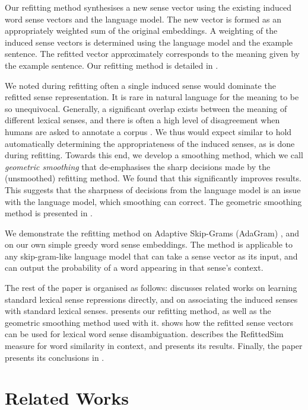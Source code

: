 \documentclass{sig-alternate}
\begin{document}
Our refitting method synthesises a new sense vector using the existing induced word sense vectors and the language model.
The new vector is formed as an appropriately weighted sum of the original embeddings. A weighting of the induced sense vectors is determined using the language model and the example sentence.
The refitted vector approximately corresponds to the meaning given by the example sentence. 
Our refitting method is detailed in .

We noted during refitting often a single induced sense would dominate the refitted sense representation. It is rare in natural language for the meaning to be so unequivocal. Generally, a significant overlap exists between the meaning of different lexical senses, and there is often a high level of disagreement when humans are asked to annotate a corpus \parencite{veronis1998study}. We thus would expect similar to hold automatically determining the appropriateness of the induced senses, as is done during refitting. Towards this end, we develop a smoothing method, which we call \emph{geometric smoothing} that de-emphasises the sharp decisions made by the (unsmoothed) refitting method. We found that this significantly improves results. This suggests that the sharpness of decisions from the language model is an issue with the language model, which smoothing can correct. The geometric smoothing method is presented in .


We demonstrate the refitting method on Adaptive Skip-Grams (AdaGram) \parencite{AdaGrams}, and on our own simple greedy word sense embeddings. The method is applicable to any skip-gram-like language model that can take a sense vector as its input, and can output the probability of a word appearing in that sense's context.


The rest of the paper is organised as follows:  discusses related works on learning standard lexical sense repressions directly, and on associating the induced senses with standard lexical senses.  presents our refitting method, as well as the geometric smoothing method used with it.  shows how the refitted sense vectors can be used for lexical word sense disambiguation.  describes the RefittedSim measure for word similarity in context, and presents its results. Finally, the paper presents its conclusions in .

\section{Related Works} \label{relatedwords}
\end{document}
